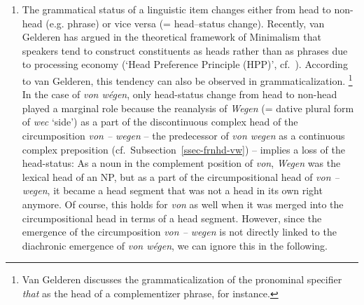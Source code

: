 \documentclass[output=paper
  ,nobabel
  ,draftmode
  ,babelshorthands
  ,colorlinks, citecolor=brown
]{langscibook}
\begin{document}
\begin{enumerate}
    \item The grammatical status of a linguistic item changes either from head to non-head (e.g. phrase) or vice versa (= head--status change). Recently, van Gelderen has argued in the theoretical framework of Minimalism that speakers tend to construct constituents as heads rather than as phrases due to processing economy (`Head Preference Principle (HPP)', cf.\ \citealp[13–14]{VanGelderen2011}).
    According to van Gelderen, this tendency can also be observed in grammaticalization.%
\footnote{Van Gelderen discusses the grammaticalization of the pronominal specifier \emph{that} as the head of a complementizer phrase, for instance.}
    In the case of \emph{von wégen}, only head-status change from head to non-head played a marginal role because the reanalysis of \emph{Wegen} (= dative plural form of \emph{wec} `side') as a part of the discontinuous complex head of the circumposition \emph{von – wegen} – the predecessor of \emph{von wegen} as a continuous complex preposition (cf.\ Subsection~\ref{ssec-frnhd-vw}) – implies a loss of the head-status: As a noun in the complement position of \emph{von}, \emph{Wegen} was the lexical head of an NP, but as a part of the circumpositional head of \emph{von – wegen}, it became a head segment that was not a head in its own right anymore. Of course, this holds for \emph{von} as well when it was merged into the circumpositional head in terms of a head segment. However, since the emergence of the circumposition \emph{von – wegen} is not directly linked to the diachronic emergence of \emph{von wégen}, we can ignore this in the following.
    

\end{enumerate}
\end{document}
